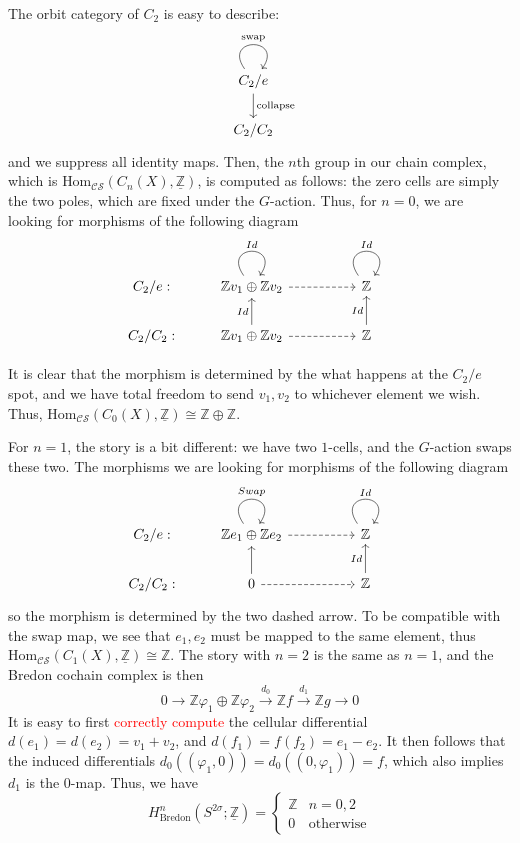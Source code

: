 \documentclass{article}
\theoremstyle{definition}
\theoremstyle{definition}
\theoremstyle{definition}
\theoremstyle{definition}
\theoremstyle{definition}
\theoremstyle{definition}
\theoremstyle{definition}
\begin{document}
The orbit category of $C_2$ is easy to describe:
\[\begin{tikzcd}
	{C_2/e} \\
	{C_2/C_2}
	\arrow["{\textrm{swap}}", from=1-1, to=1-1, loop, in=55, out=125, distance=10mm]
	\arrow["{\textrm{collapse}}", from=1-1, to=2-1]
\end{tikzcd}\]
and we suppress all identity maps. Then, the $n$th group in our chain complex, which is $\textrm{Hom}_{\mathcal{CS}}(C_n(X),\underline{\mathbb{Z}})$, is computed as follows: the zero cells are simply the two poles, which are fixed under the $G$-action. Thus, for $n=0$, we are looking for morphisms of the following diagram 
\[\begin{tikzcd}
	{C_2/e:} & {\mathbb{Z}v_1\oplus\mathbb{Z}v_2} && {\mathbb{Z}} \\
	{C_2/C_2:} & {\mathbb{Z}v_1\oplus\mathbb{Z}v_2} && {\mathbb{Z}}
	\arrow["Id", from=1-2, to=1-2, loop, in=55, out=125, distance=10mm]
	\arrow[dashed, from=1-2, to=1-4]
	\arrow["Id", from=1-4, to=1-4, loop, in=55, out=125, distance=10mm]
	\arrow["Id", from=2-2, to=1-2]
	\arrow[dashed, from=2-2, to=2-4]
	\arrow["Id", from=2-4, to=1-4]
\end{tikzcd}\]

It is clear that the morphism is determined by the what happens at the $C_2/e$ spot, and we have total freedom to send $v_1,v_2$ to whichever element we wish. Thus, $\textrm{Hom}_{\mathcal{CS}}(C_0(X),\underline{\mathbb{Z}})\cong \mathbb{Z}\oplus \mathbb{Z}$. 

For $n=1$, the story is a bit different: we have two $1$-cells, and the $G$-action swaps these two. The morphisms 
we are looking for morphisms of the following diagram 
\[\begin{tikzcd}
	{C_2/e:} & {\mathbb{Z}e_1\oplus\mathbb{Z}e_2} && {\mathbb{Z}} \\
	{C_2/C_2:} & 0 && {\mathbb{Z}}
	\arrow["Swap", from=1-2, to=1-2, loop, in=55, out=125, distance=10mm]
	\arrow[dashed, from=1-2, to=1-4]
	\arrow["Id", from=1-4, to=1-4, loop, in=55, out=125, distance=10mm]
	\arrow[from=2-2, to=1-2]
	\arrow[dashed, from=2-2, to=2-4]
	\arrow["Id", from=2-4, to=1-4]
\end{tikzcd}\]
so the morphism is determined by the two dashed arrow. To be compatible with the swap map, we see that $e_1,e_2$ must be mapped to the same element, thus $\textrm{Hom}_{\mathcal{CS}}(C_1(X),\underline{\mathbb{Z}})\cong \mathbb{Z}$. The story with $n=2$ is the same as $n=1$, and the Bredon cochain complex is then 
\[0\to \mathbb{Z}\varphi_1\oplus \mathbb{Z}\varphi_2\xrightarrow{d_0} \mathbb{Z}f\xrightarrow{d_1} \mathbb{Z}g\to 0\] 
It is easy to first \textcolor{red}{correctly compute} the cellular differential $d(e_1)=d(e_2)=v_1+v_2$, and $d(f_1)=f(f_2)=e_1-e_2$. It then follows that the induced differentials $d_0((\varphi_1,0))=d_0((0,\varphi_1))=f$, which also implies $d_1$ is the $0$-map. Thus, we have 
\[H^n_{\textrm{Bredon}}(S^{2\sigma}; \underline{\mathbb{Z}})=
\begin{cases}
    \mathbb{Z}& n=0,2\\
    0 & \textrm{otherwise}
\end{cases}
\] 
\end{document}
